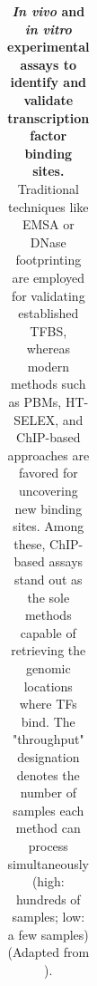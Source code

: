 \documentclass[a4paper, titlepage, openright]{book}
\begin{document}
\begin{table}[]
{\begin{tabular}{|l|l|l|l|l|l|l|}
    \end{tabular}%
    }
    \caption[\emph{In vivo} and \emph{in vitro} experimental assays to identify and validate transcription factor binding sites]{\textbf{\emph{In vivo} and \emph{in vitro} experimental assays to identify and validate transcription factor binding sites.} Traditional techniques like EMSA or DNase footprinting are employed for validating established TFBS, whereas modern methods such as PBMs, HT-SELEX, and ChIP-based approaches are favored for uncovering new binding sites. Among these, ChIP-based assays stand out as the sole methods capable of retrieving the genomic locations where TFs bind. The "throughput" designation denotes the number of samples each method can process simultaneously (high: hundreds of samples; low: a few samples) (Adapted from \cite{tognon2023survey}).}
    \label{tab:experimental-assays-tfs}
\end{table}

\end{document}
